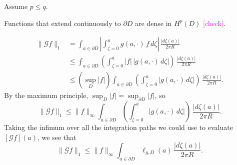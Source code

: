 \documentclass{article}
\theoremstyle{plain}
\begin{document}
\color{SeaGreen}
Assume $p \le q$.

Functions that extend continuously to $\partial D$ are dense in $H^p(D)$ \textcolor{magenta}{[check]}.
\color{black}

\color{DarkBlue}
\begin{align*}
\|\mathcal{G}f\|_1 & = \int_{a \in \partial D} \left| \int_{\zeta = 0}^{a} g(a, \cdot)\,f\,d\zeta \right|\,\frac{|d\zeta(a)|}{2\pi R} \\
& \le \int_{a \in \partial D} \left( \int_{\zeta = 0}^{a} |f|\,|g(a, \cdot)\,d\zeta| \right)\,\frac{|d\zeta(a)|}{2\pi R} \\
& \le \left( \sup_D |f| \right) \int_{a \in \partial D} \left( \int_{\zeta = 0}^{a} |g(a, \cdot)\,d\zeta| \right)\,\frac{|d\zeta(a)|}{2\pi R}.
\end{align*}
By the maximum principle, $\sup_D |f| = \sup_{\partial D} |f|$, so
\[ \|\mathcal{G}f\|_1 \le \|f\|_\infty \int_{a \in \partial D} \left( \int_{\zeta = 0}^{a} |g(a, \cdot)\,d\zeta| \right)\,\frac{|d\zeta(a)|}{2\pi R}. \]
Taking the infimum over all the integration paths we could use to evaluate $[\mathcal{G}f](a)$, we see that
\[ \|\mathcal{G}f\|_1 \le \|f\|_\infty \int_{a \in \partial D} \ell_{g, D}(a)\,\frac{|d\zeta(a)|}{2\pi R}. \]
\color{black}
\end{document}
